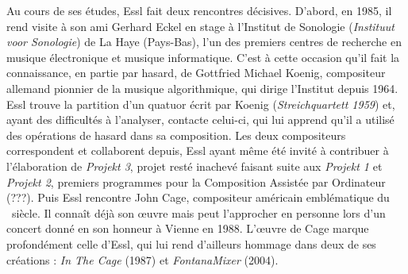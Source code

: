 \documentclass[a4paper,12pt]{article}
\begin{document}
Au cours de ses études, Essl fait deux rencontres décisives. D'abord, en 1985, il rend visite à son ami Gerhard Eckel en stage à l'Institut de Sonologie (\emph{Instituut voor Sonologie}) de La Haye (Pays-Bas), l'un des premiers centres de recherche en musique électronique et musique informatique. C'est à cette occasion qu'il fait la connaissance, en partie par hasard, de Gottfried Michael Koenig, compositeur allemand pionnier de la musique algorithmique, qui dirige l'Institut depuis 1964. Essl trouve la partition d'un quatuor écrit par Koenig (\emph{Streichquartett 1959}) et, ayant des difficultés à l'analyser, contacte celui-ci, qui lui apprend qu'il a utilisé des opérations de hasard dans sa composition. Les deux compositeurs correspondent et collaborent depuis, Essl ayant même été invité à contribuer à l'élaboration de \emph{Projekt 3}, projet resté inachevé faisant suite aux \emph{Projekt 1} et \emph{Projekt 2}, premiers programmes pour la Composition Assistée par Ordinateur (???). Puis Essl rencontre John Cage, compositeur américain emblématique du \XXe~siècle. Il connaît déjà son œuvre mais peut l'approcher en personne lors d'un concert donné en son honneur à Vienne en 1988. L'œuvre de Cage marque profondément celle d'Essl, qui lui rend d'ailleurs hommage dans deux de ses créations : \emph{In The Cage} (1987) et \emph{FontanaMixer} (2004).
\end{document}
